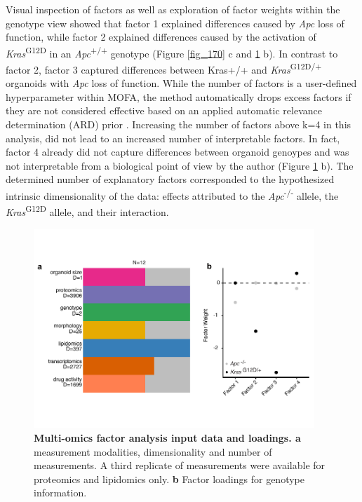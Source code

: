 \begin{flushleft}
Visual inspection of factors as well as exploration of factor weights within the genotype view showed that factor 1 explained differences caused by \textit{Apc} loss of function, while factor 2 explained differences caused by the activation of \textit{Kras}\textsuperscript{G12D} in an \textit{Apc}\textsuperscript{+/+} genotype (Figure \ref{fig_170} c and \ref{fig_180} b). In contrast to factor 2, factor 3 captured differences between Kras+/+ and \textit{Kras}\textsuperscript{G12D/+} organoids with \textit{Apc} loss of function. While the number of factors is a user-defined hyperparameter within MOFA, the method automatically drops excess factors if they are not considered effective based on an applied automatic relevance determination (ARD) prior \citep{argelaguetMultiOmicsFactorAnalysis2018b}. Increasing the number of factors above k=4 in this analysis, did not lead to an increased number of interpretable factors. In fact, factor 4 already did not capture differences between organoid genoypes and was not interpretable from a biological point of view by the author (Figure \ref{fig_180} b). The determined number of explanatory factors corresponded to the hypothesized intrinsic dimensionality of the data: effects attributed to the \textit{Apc}\textsuperscript{-/-}  allele, the \textit{Kras}\textsuperscript{G12D} allele, and their interaction.

\begin{figure}[h!]
\centering
\includegraphics[width=400,
                height=\textheight,
                keepaspectratio]{figures/adenomaprofiling/pdf/fig_1_8.pdf}
\caption[Multi-omics factor analysis input data and loadings]{\textbf{Multi-omics factor analysis input data and loadings. a} measurement modalities, dimensionality and number of measurements. A third replicate of measurements were available for proteomics and lipidomics only. \textbf{b} Factor loadings for genotype information.} 
\label{fig_180}
\end{figure}
\bigbreak


\end{flushleft}

